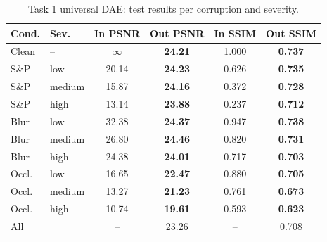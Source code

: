 \begin{table}[t]\centering\caption{Task 1 universal DAE: test results per corruption and severity.}\label{tab:t1}
\setlength{\tabcolsep}{4pt}\begin{tabular}{llcccc}\toprule
Cond. & Sev. & In PSNR & Out PSNR & In SSIM & Out SSIM\\\midrule
Clean & -- & $\infty$ & \textbf{24.21} & 1.000 & \textbf{0.737}\\
S\&P & low & 20.14 & \textbf{24.23} & 0.626 & \textbf{0.735}\\
S\&P & medium & 15.87 & \textbf{24.16} & 0.372 & \textbf{0.728}\\
S\&P & high & 13.14 & \textbf{23.88} & 0.237 & \textbf{0.712}\\
Blur & low & 32.38 & \textbf{24.37} & 0.947 & \textbf{0.738}\\
Blur & medium & 26.80 & \textbf{24.46} & 0.820 & \textbf{0.731}\\
Blur & high & 24.38 & \textbf{24.01} & 0.717 & \textbf{0.703}\\
Occl. & low & 16.65 & \textbf{22.47} & 0.880 & \textbf{0.705}\\
Occl. & medium & 13.27 & \textbf{21.23} & 0.761 & \textbf{0.673}\\
Occl. & high & 10.74 & \textbf{19.61} & 0.593 & \textbf{0.623}\\
\midrule All & & -- & 23.26 & -- & 0.708\\
\bottomrule\end{tabular}\end{table}